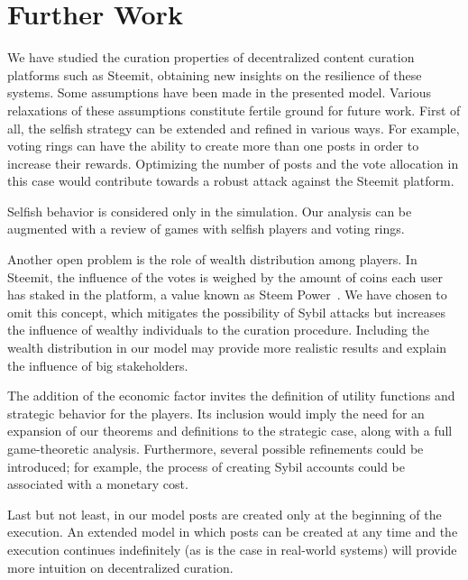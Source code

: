 \section{Further Work}

  We have studied the curation properties of decentralized content curation
  platforms such as Steemit, obtaining new insights on the resilience of these
  systems. Some assumptions have been made in the presented model. Various
  relaxations of these assumptions constitute fertile ground for future work.
  First of all, the selfish strategy can be extended and refined in various
  ways. For example, voting rings can have the ability to create more than one
  posts in order to increase their rewards. Optimizing the number of posts and
  the vote allocation in this case would contribute towards a robust attack
  against the Steemit platform.

  Selfish behavior is considered only in the simulation. Our analysis can be
  augmented with a review of games with selfish players and voting rings.

  Another open problem is the role of wealth distribution among players. In
  Steemit, the influence of the votes is weighed by the amount of coins each
  user has staked in the platform, a value known as Steem Power~\cite{steemit}.
  We have chosen to omit this concept, which mitigates the possibility of Sybil
  attacks but increases the influence of wealthy individuals to the curation
  procedure. Including the wealth distribution in our model may provide more
  realistic results and explain the influence of big stakeholders.

  The addition of the economic factor invites the definition of utility
  functions and strategic behavior for the players. Its inclusion would imply
  the need for an expansion of our theorems and definitions to the strategic
  case, along with a full game-theoretic analysis. Furthermore, several possible
  refinements could be introduced; for example, the process of creating Sybil
  accounts could be associated with a monetary cost.

  Last but not least, in our model posts are created only at the beginning of
  the execution. An extended model in which posts can be created at any time and
  the execution continues indefinitely (as is the case in real-world systems)
  will provide more intuition on decentralized curation.

